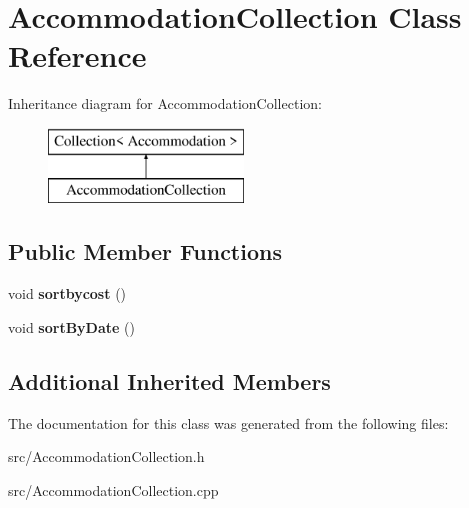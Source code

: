 \hypertarget{class_accommodation_collection}{}\section{Accommodation\+Collection Class Reference}
\label{class_accommodation_collection}
Inheritance diagram for Accommodation\+Collection\+:\begin{figure}[H]
\begin{center}
\leavevmode
\includegraphics[height=2.000000cm]{class_accommodation_collection}
\end{center}
\end{figure}
\subsection*{Public Member Functions}
\begin{DoxyCompactItemize}
\item 
\mbox{\label{class_accommodation_collection_accd0beebc1658e747c569a9d8c07bd1c}} 
void {\bfseries sortbycost} ()
\item 
\mbox{\label{class_accommodation_collection_a9d5d3fe1e5c078e24553592a5d521178}} 
void {\bfseries sort\+By\+Date} ()
\end{DoxyCompactItemize}
\subsection*{Additional Inherited Members}


The documentation for this class was generated from the following files\+:\begin{DoxyCompactItemize}
\item 
src/Accommodation\+Collection.\+h\item 
src/Accommodation\+Collection.\+cpp\end{DoxyCompactItemize}
